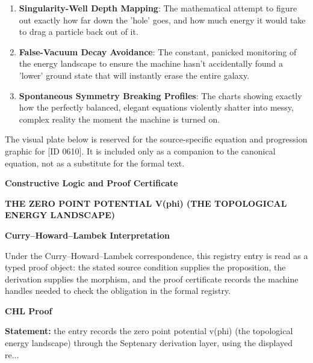 \begin{enumerate}[leftmargin=1.6em,itemsep=6pt,topsep=4pt]
\item \textbf{Singularity-Well Depth Mapping}: The mathematical attempt to figure out exactly how far down the 'hole' goes, and how much energy it would take to drag a particle back out of it.
\item \textbf{False-Vacuum Decay Avoidance}: The constant, panicked monitoring of the energy landscape to ensure the machine hasn't accidentally found a 'lower' ground state that will instantly erase the entire galaxy.
\item \textbf{Spontaneous Symmetry Breaking Profiles}: The charts showing exactly how the perfectly balanced, elegant equations violently shatter into messy, complex reality the moment the machine is turned on.
\end{enumerate}

\begingroup\footnotesize\sloppy
The visual plate below is reserved for the source-specific equation and progression graphic for [ID 0610]. It is included only as a companion to the canonical equation, not as a substitute for the formal text.
\par\endgroup
\ifTZPDarkEdition
{}
\fi

\clearpage
\begingroup\tzpsupportsetup
\noindent\textbf{\fontsize{10.8pt}{12.8pt}\selectfont [ID 0610] Constructive Logic and Proof Certificate}\par
\noindent\textbf{\fontsize{10pt}{12pt}\selectfont THE ZERO POINT POTENTIAL V(phi) (THE TOPOLOGICAL ENERGY LANDSCAPE)}\par
\vspace{0.45em}
\begingroup
\footnotesize
\setlength{\parskip}{0.22em}
\setlength{\parindent}{0pt}
\noindent\textbf{Curry--Howard--Lambek Interpretation}\par
Under the Curry--Howard--Lambek correspondence, this registry entry is read as a typed proof
object: the stated source condition supplies the proposition, the derivation supplies the
morphism, and the proof certificate records the machine handles needed to check the obligation
in the formal registry.

\vspace{0.45em}
\noindent\textbf{CHL Proof}\par
\textbf{Statement:} the entry records the zero point potential v(phi) (the topological energy landscape)
through the Septenary derivation layer, using the displayed re...

